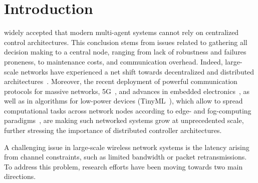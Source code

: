 
\section{Introduction}\label{sec:intro}

 widely accepted that
modern multi-agent systems cannot rely on centralized control architectures.
This conclusion stems from issues related to gathering
all decision making to a central node,
ranging from lack of robustness and failures proneness,
to maintenance costs,
and communication overhead.
Indeed, large-scale networks
have experienced a net shift
towards decentralized and distributed architectures~\cite{JOVANOVIC201676,8340193}.
Moreover, the recent deployment of powerful communication protocols for massive networks,
\eg 5G~\cite{BIRAL20151,li20185g},
and advances in embedded electronics~\cite{8600375,nvidia},
as well as in algorithms for low-power devices (\eg TinyML~\cite{warden2019tinyml}),
which allow to spread computational tasks across network nodes
according to edge- and fog-computing paradigms~\cite{shi2020joint,shi2016edge,yi2015survey},
are making such networked systems grow at unprecedented scale,
further stressing the importance of distributed controller architectures.

A challenging issue in large-scale wireless network systems is
the latency arising from channel constraints, such as
limited bandwidth or packet retransmissions.
To address this problem,
research efforts have been moving towards two main directions.
